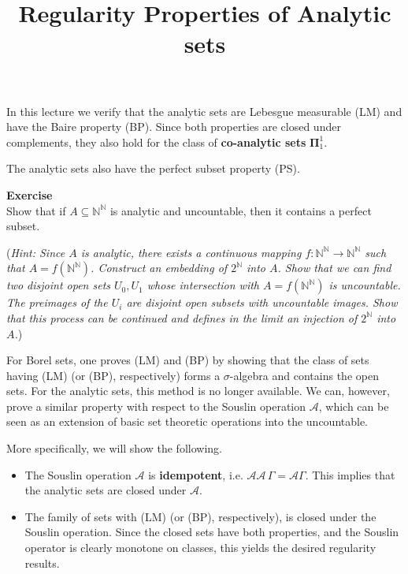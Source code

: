 \documentclass{article}
\title{Regularity Properties of Analytic sets}
\date{\displaydate{articleDate}}
\author{}
\newcommand{\bPi}{\pmb{\Pi}}
\newcommand{\PP}[1]{\bPi^1_{#1}}
\newcommand{\Baire}{\Nat^{\Nat}}
\newcommand{\Cant}{2^{\Nat}}
\newcommand{\Nat}{\mathbb{N}}
\begin{document}
\maketitle

In this lecture we verify that the analytic sets are Lebesgue measurable (LM) and have the Baire property (BP). Since both properties are closed under complements, they also hold for the class of \textbf{co-analytic sets} $\PP{1}$.

The analytic sets also have the perfect subset property (PS).

\begin{framed}
\textbf{Exercise}\\
Show that if $A \subseteq \Baire$ is analytic and uncountable, then it contains a perfect subset.

(\textit{Hint: Since $A$ is analytic, there exists a continuous mapping $f:\Baire \to \Baire$ such that $A = f(\Baire)$. Construct an embedding of $\Cant$ into $A$. Show that we can find two disjoint open sets $U_0, U_1$ whose intersection with  $A = f(\Baire)$ is uncountable. The preimages of the $U_i$ are disjoint open subsets with uncountable images. Show that this process can be continued and defines in the limit an injection of $\Cant$ into $A$.})
\end{framed}

For Borel sets, one proves (LM) and (BP) by showing that the class of sets having  (LM) (or (BP), respectively)  forms a ${}\sigma$-algebra and contains the open sets. For the analytic sets, this method is no longer available. We can, however, prove a similar property with respect to the Souslin operation $\mathcal{A}$, which can be seen as an extension of basic set theoretic operations into the uncountable.

More specifically, we will show the following.

\begin{itemize}
\item The Souslin operation $\mathcal{A}$ is \textbf{idempotent}, i.e. $\mathcal{A}\mathcal{A} \, \Gamma = \mathcal{A}\Gamma$. This implies that the analytic sets are closed under $\mathcal{A}$.


\item The family of sets with (LM) (or (BP), respectively), is closed under the Souslin operation. Since the closed sets have both properties, and the Souslin operator is clearly monotone on classes, this yields the desired regularity results.
\end{itemize}
\end{document}
